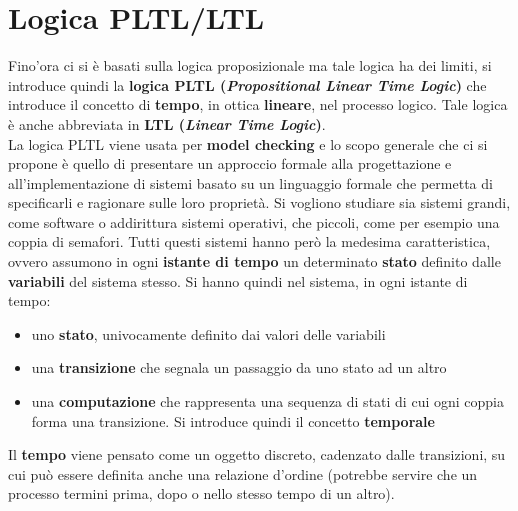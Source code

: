 \section{Logica PLTL/LTL}
Fino'ora ci si è basati sulla logica proposizionale ma tale logica ha dei
limiti, si introduce quindi la 
\textbf{logica PLTL (\textit{Propositional Linear Time Logic})} che introduce il
concetto di \textbf{tempo}, in ottica \textbf{lineare}, nel processo
logico. Tale logica è anche abbreviata in \textbf{LTL (\textit{Linear Time
    Logic})}.\\  
La logica PLTL viene usata per \textbf{model checking} e lo scopo generale che
ci si propone è quello di presentare un approccio formale alla progettazione e
all'implementazione di sistemi basato su un linguaggio formale che permetta di
specificarli e ragionare sulle loro proprietà. Si vogliono studiare sia sistemi
grandi, come software o addirittura sistemi operativi, che piccoli, come per
esempio una coppia di semafori. Tutti questi sistemi hanno però la medesima
caratteristica, ovvero assumono in ogni \textbf{istante di tempo} un determinato
\textbf{stato} definito dalle \textbf{variabili} del sistema stesso. Si hanno
quindi nel sistema, in ogni istante di tempo:
\begin{itemize}
  \item uno \textbf{stato}, univocamente definito dai valori delle variabili
  \item una \textbf{transizione} che segnala un passaggio da uno stato ad un
  altro
  \item una \textbf{computazione} che rappresenta una sequenza di stati di cui
  ogni coppia forma una transizione. Si introduce quindi il concetto
  \textbf{temporale} 
\end{itemize}
Il \textbf{tempo} viene pensato come un oggetto discreto, cadenzato dalle
transizioni, su cui può essere definita anche una relazione d'ordine (potrebbe
servire che un processo termini prima, dopo o nello stesso tempo di un altro).
